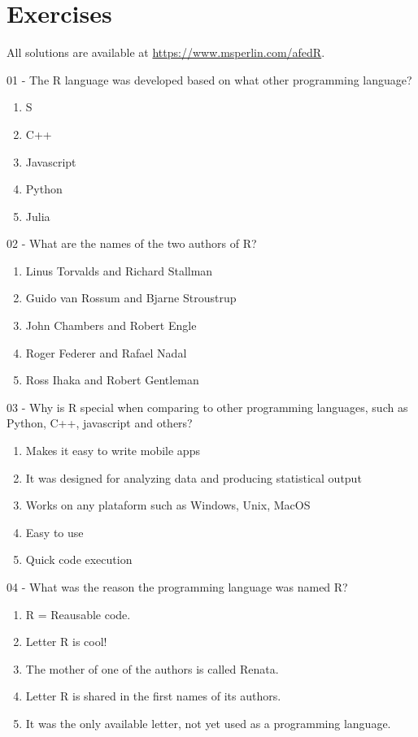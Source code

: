 \documentclass[
  12pt,
]{book}
\providecommand{\tightlist}{%
  \setlength{\itemsep}{0pt}\setlength{\parskip}{0pt}}
\begin{document}
\hypertarget{exercises}{%
\section{Exercises}\label{exercises}}

All solutions are available at \url{https://www.msperlin.com/afedR}.

01 -
The R language was developed based on what other programming language?

\begin{enumerate}
\def\labelenumi{\alph{enumi})}
\tightlist
\item
  S
\item
  C++
\item
  Javascript
\item
  Python
\item
  Julia
\end{enumerate}

02 -
What are the names of the two authors of R?

\begin{enumerate}
\def\labelenumi{\alph{enumi})}
\tightlist
\item
  Linus Torvalds and Richard Stallman
\item
  Guido van Rossum and Bjarne Stroustrup
\item
  John Chambers and Robert Engle
\item
  Roger Federer and Rafael Nadal
\item
  Ross Ihaka and Robert Gentleman
\end{enumerate}

03 -
Why is R special when comparing to other programming languages, such as Python, C++, javascript and others?

\begin{enumerate}
\def\labelenumi{\alph{enumi})}
\tightlist
\item
  Makes it easy to write mobile apps
\item
  It was designed for analyzing data and producing statistical output
\item
  Works on any plataform such as Windows, Unix, MacOS
\item
  Easy to use
\item
  Quick code execution
\end{enumerate}

04 -
What was the reason the programming language was named R?

\begin{enumerate}
\def\labelenumi{\alph{enumi})}
\tightlist
\item
  R = Reausable code.
\item
  Letter R is cool!
\item
  The mother of one of the authors is called Renata.
\item
  Letter R is shared in the first names of its authors.
\item
  It was the only available letter, not yet used as a programming language.
\end{enumerate}
\end{document}
